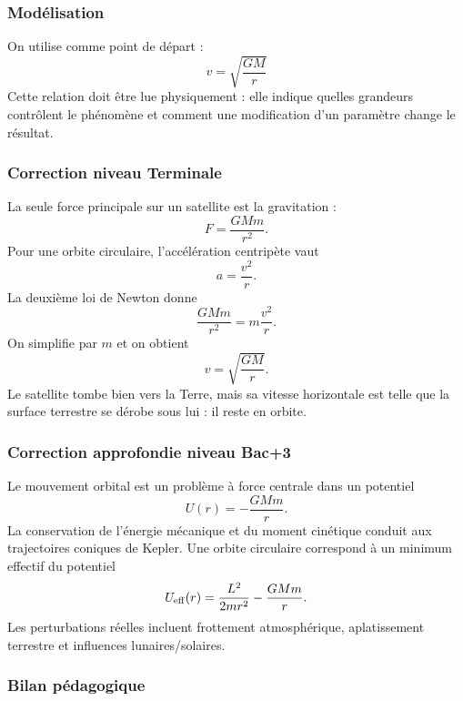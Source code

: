\documentclass[11pt,a4paper]{article}
\begin{document}
\subsubsection*{Modélisation}

\begin{theorembox}
On utilise comme point de départ :
\[
v=\sqrt{\frac{GM}{r}}
\]
Cette relation doit être lue physiquement : elle indique quelles grandeurs contrôlent le phénomène et comment une modification d'un paramètre change le résultat.
\end{theorembox}

\subsubsection*{Correction niveau Terminale}

\begin{corrigebox}

La seule force principale sur un satellite est la gravitation :
\[
F=\frac{GMm}{r^2}.
\]
Pour une orbite circulaire, l'accélération centripète vaut
\[
a=\frac{v^2}{r}.
\]
La deuxième loi de Newton donne
\[
\frac{GMm}{r^2}=m\frac{v^2}{r}.
\]
On simplifie par \(m\) et on obtient
\[
v=\sqrt{\frac{GM}{r}}.
\]
Le satellite tombe bien vers la Terre, mais sa vitesse horizontale est telle que la surface terrestre se dérobe sous lui : il reste en orbite.

\end{corrigebox}

\subsubsection*{Correction approfondie niveau Bac+3}

\begin{approfondissementbox}

Le mouvement orbital est un problème à force centrale dans un potentiel
\[
U(r)=-\frac{GMm}{r}.
\]
La conservation de l'énergie mécanique et du moment cinétique conduit aux trajectoires coniques de Kepler. Une orbite circulaire correspond à un minimum effectif du potentiel
\[
U_{\rm eff}(r)=\frac{L^2}{2mr^2}-\frac{GMm}{r}.
\]
Les perturbations réelles incluent frottement atmosphérique, aplatissement terrestre et influences lunaires/solaires.

\end{approfondissementbox}

\subsubsection*{Bilan pédagogique}
\end{document}
